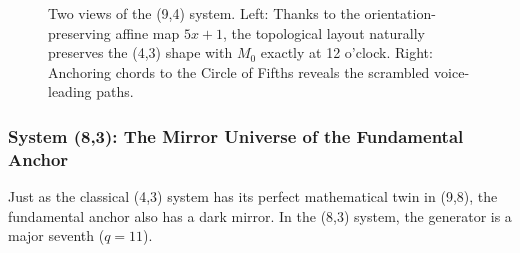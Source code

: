 \documentclass[11pt,letterpaper]{amsart}
\begin{document}
\begin{figure}[H]
\begin{minipage}{0.48\textwidth}
        \caption*{Pitch-Space Layout \\ (Geometric Rewiring)}
    \end{minipage}
    \caption{Two views of the (9,4) system. Left: Thanks to the orientation-preserving affine map $5x+1$, the topological layout naturally preserves the (4,3) shape with $M_0$ exactly at 12 o'clock. Right: Anchoring chords to the Circle of Fifths reveals the scrambled voice-leading paths.}
\end{figure}


\subsubsection{System (8,3): The Mirror Universe of the Fundamental Anchor}

Just as the classical (4,3) system has its perfect mathematical twin in (9,8), the fundamental anchor also has a dark mirror. In the (8,3) system, the generator is a major seventh ($q=11$). 
\end{document}
